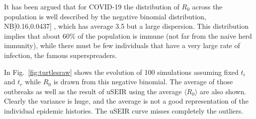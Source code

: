 \documentclass[a4paper,oneside,11pt]{article}
\begin{document}
  It has been argued that for COVID-19 the distribution of $R_0$ across the population is well described by the negative binomial distribution, NB[0.16,0.0437] \cite{LloydSmithNovember2020}, which has average 3.5 but a large dispersion. This distribution implies that about $60\%$ of the population is immune  (not far from the naive herd immunity), while there must be few individuals that have a very large rate of infection, the famous superspreaders.

  In Fig.~\ref{fig:turtlesraw} shows the evolution of 100 simulations assuming fixed $t_i$ and $t_r$ while $R_0$ is drawn from this negative binomial. The average of those outbreaks as well as the result of
  uSEIR using the average $\langle R_0\rangle$ are also shown. Clearly the variance is huge, and the average is not a good representation of the individual epidemic histories. The uSEIR curve misses completely the outliers.
\end{document}
